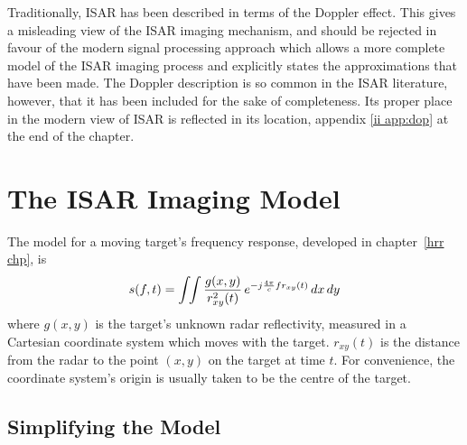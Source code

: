 Traditionally, ISAR has been described in terms of the Doppler effect.  This
gives a misleading view of the ISAR imaging mechanism, and should be
rejected in favour of the modern signal processing approach which allows a
more complete model of the ISAR imaging process and explicitly states the 
approximations that have been made.  The Doppler description is so common in
the ISAR literature, however, that it has been included for the sake of
completeness.  Its proper place in the modern view of ISAR is reflected in
its location, appendix \ref{ii app:dop} at the end of the chapter.


\section{The ISAR Imaging Model}

The model for a moving target's frequency response, developed in 
chapter~\ref{hrr chp}, is
\begin{equation}\label{ii eqn:s(f,t)}
s(f,t)=\int\!\!\int\frac{g(x,y)}{r_{xy}^2(t)}\,e^{-j{\frac{4\pi}{c}} f r_{xy}(t)}\,dx\,dy
\end{equation}
where $g(x,y)$ is the target's unknown radar reflectivity, measured in 
a Cartesian coordinate system which moves with the target.  $r_{xy}(t)$ is
the distance from the radar to the point $(x,y)$ on the target at time $t$. 
For convenience, the coordinate system's origin is usually taken to be the
centre of the target.

\subsection{Simplifying the Model}

